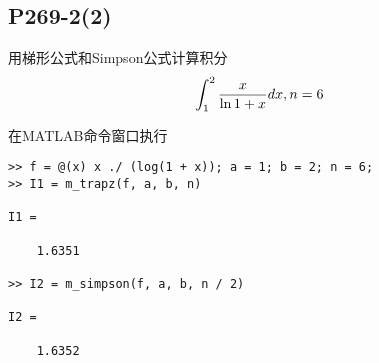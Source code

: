 \subsection{P269-2(2)}
\renewcommand{\FX}{\frac{x}{\ln{1 + x}}}
\renewcommand{\LRANGE}{1}
\renewcommand{\RRANGE}{2}
\renewcommand{\N}{6}

用梯形公式和Simpson公式计算积分
\begin{displaymath}
\INTRANGE{\FX}{x}, n = \N
\end{displaymath}

\begin{SOLVE}
在MATLAB命令窗口执行
\begin{lstlisting}
>> f = @(x) x ./ (log(1 + x)); a = 1; b = 2; n = 6;
>> I1 = m_trapz(f, a, b, n)

I1 =

    1.6351

>> I2 = m_simpson(f, a, b, n / 2)

I2 =

    1.6352

\end{lstlisting}
\end{SOLVE}
